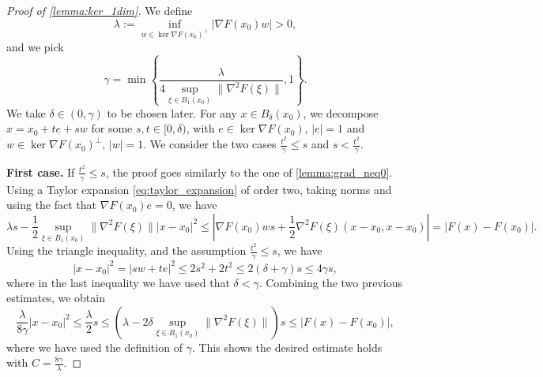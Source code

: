 \documentclass{amsart}
\begin{document}
\begin{proof}[Proof of \cref{lemma:ker_1dim}]
    We define
    \begin{equation}
        \lambda:=\inf_{w\in\ker\nabla F(x_0)^\perp}|\nabla F(x_0)w|>0,
    \end{equation}
    and we pick 
    $$
        \gamma=\min\left\{\frac{\lambda}{4\sup_{\xi\in B_1(x_0)}\|\nabla^2 F(\xi)\|},1\right\}.
    $$
    We take $\delta\in(0,\gamma)$ to be chosen later. For any $x\in B_\delta(x_0)$, we decompose $x=x_0+te+sw$ for some $s,t\in[0,\delta)$, with $e\in\ker\nabla F(x_0),\,|e|=1$ and $w\in\ker\nabla F(x_0)^\perp,\,|w|=1$.
    We consider the two cases $\frac{t^2}{\gamma}\leq s$ and $s<\frac{t^2}{\gamma}$.
    
    \textbf{First case.} If $\frac{t^2}{\gamma}\leq s$, the proof goes similarly to the one of \cref{lemma:grad_neq0}.
    Using a Taylor expansion \eqref{eq:taylor_expansion} of order two, taking norms and using the fact that $\nabla F(x_0)e=0$, we have
    \begin{equation*}
        \lambda s-\frac{1}{2}\sup_{\xi\in B_1(x_0)}\|\nabla^2 F(\xi)\| |x-x_0|^2\le\left|\nabla F(x_0)w s+\frac{1}{2}\nabla^2 F(\xi)(x-x_0,x-x_0)\right| = |F(x)-F(x_0)|.
    \end{equation*}
    Using the triangle inequality, and the assumption $\frac{t^2}{\gamma}\leq s$, we have
    \begin{equation*}
        |x-x_0|^2=|sw+te|^2\le 2s^2+2t^2\leq 2(\delta+\gamma) s\leq 4\gamma s,
    \end{equation*}
    where in the last inequality we have used that $\delta<\gamma$. Combining the two previous estimates, we obtain
    \begin{equation*}
        \frac{\lambda}{8\gamma} |x-x_0|^2\le\frac{\lambda}{2} s\le \left(\lambda-2\delta \sup_{\xi\in B_1(x_0)}\|\nabla^2 F(\xi)\|\right) s \le |F(x)-F(x_0)|,
    \end{equation*}
    where we have used the definition of $\gamma$. This shows the desired estimate holds with $C=\frac{8\gamma}{\lambda}$.
    

\end{proof}
\end{document}
